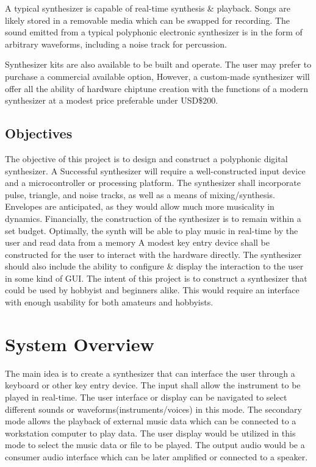 \documentclass[bibtotocnumbered,abstract=on,paper=a4,fontsize=12pt,parskip=on,halfparskip=on]{scrartcl}		%
\begin{document}
A typical synthesizer is capable of real-time synthesis \& playback. Songs are likely stored in a removable media which can be swapped for recording. The sound emitted from a typical polyphonic electronic synthesizer is in the form of arbitrary waveforms, including a noise track for percussion.

Synthesizer kits are also available to be built and operate. The user may prefer to purchase a commercial available option, However, a custom-made synthesizer will offer all the ability of hardware chiptune creation with the functions of a modern synthesizer at a modest price preferable under USD\$200. 
  \subsection{Objectives}
The objective of this project is to design and construct a polyphonic digital synthesizer. A Successful synthesizer will require a well-constructed input device and a microcontroller or processing platform. The synthesizer shall incorporate pulse, triangle, and noise tracks, as well as a means of mixing/synthesis. Envelopes are anticipated, as they would allow much more musicality in dynamics. Financially, the construction of the synthesizer is to remain within a set budget. Optimally, the synth will be able to play music in real-time by the user and read data from a memory A modest key entry device shall be constructed for the user to interact with the hardware directly. The synthesizer should also include the ability to configure \& display the interaction to the user in some kind of GUI. The intent of this project is to construct a synthesizer that could be used by hobbyist and beginners alike. This would require an interface with enough usability for both amateurs and hobbyists.
\clearpage
\section{System Overview}
The main idea is to create a synthesizer that can interface the user through a keyboard or other key entry device. The input shall allow the instrument to be played in real-time. The user interface or display can be navigated to select different sounds or waveforms(instruments/voices) in this mode. The secondary mode allows the playback of external music data which can be connected to a workstation computer to play data. The user display would be utilized in this mode to select the music data or file to be played. The output audio would be a consumer audio interface which can be later amplified or connected to a speaker.
\end{document}
